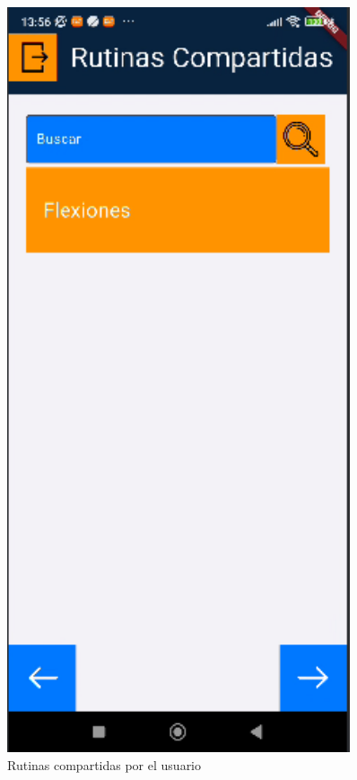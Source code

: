 \begin{figure}[H]
\begin{minipage}{0.45\textwidth}
      \label{fig:rutinaMiaOComp}
   \end{minipage}%
   \hspace{0.5cm}
   \begin{minipage}{0.45\textwidth}
      \centering
      \includegraphics[width=0.9\textwidth]{pantallas/rutinasCompUsuario.png}
      \caption{Rutinas compartidas por el usuario}
      \label{fig:rutinasCompUsuario}
   \end{minipage}
\end{figure}


